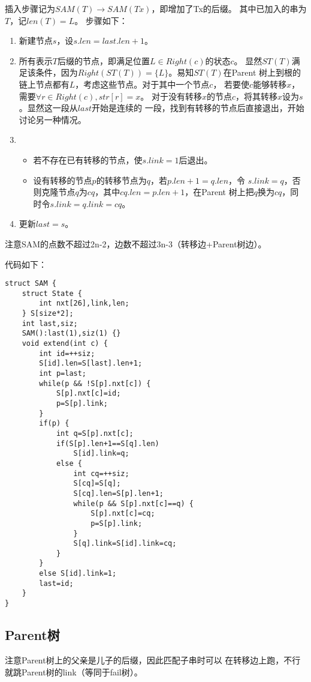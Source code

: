 插入步骤记为$SAM(T)\rightarrow SAM(Tx)$，即增加了Tx的后缀。
其中已加入的串为$T$，记$len(T)=L$。
步骤如下：
\begin{enumerate}
    \item 新建节点$s$，设$s.len=last.len+1$。
    \item 所有表示$T$后缀的节点，即满足位置$L\in Right(c)$的状态$c$。
    显然$ST(T)$满足该条件，因为$Right(ST(T))=\{L\}$。易知$ST(T)$在Parent
    树上到根的链上节点都有$L$，考虑这些节点。对于其中一个节点$c$，
    若要使$c$能够转移$x$，需要$\forall{r\in Right(c)},str[r]=x$。
    对于没有转移$x$的节点$c$，将其转移$x$设为$s$。显然这一段从$last$开始是连续的
    一段，找到有转移的节点后直接退出，开始讨论另一种情况。
    \item \begin{itemize}
        \item 若不存在已有转移的节点，使$s.link=1$后退出。
        \item 设有转移的节点$p$的转移节点为$q$，若$p.len+1=q.len$，令
        $s.link=q$，否则克隆节点$q$为$cq$，其中$cq.len=p.len+1$，在Parent
        树上把$q$换为$cq$，同时令$s.link=q.link=cq$。
    \end{itemize}
    \item 更新$last=s$。
\end{enumerate}
注意SAM的点数不超过2n-2，边数不超过3n-3（转移边+Parent树边）。

代码如下：
\begin{lstlisting}
struct SAM {
    struct State {
        int nxt[26],link,len;
    } S[size*2];
    int last,siz;
    SAM():last(1),siz(1) {}
    void extend(int c) {
        int id=++siz;
        S[id].len=S[last].len+1;
        int p=last;
        while(p && !S[p].nxt[c]) {
            S[p].nxt[c]=id;
            p=S[p].link;
        }
        if(p) {
            int q=S[p].nxt[c];
            if(S[p].len+1==S[q].len)
                S[id].link=q;
            else {
                int cq=++siz;
                S[cq]=S[q];
                S[cq].len=S[p].len+1;
                while(p && S[p].nxt[c]==q) {
                    S[p].nxt[c]=cq;
                    p=S[p].link;
                }
                S[q].link=S[id].link=cq;
            }
        }
        else S[id].link=1;
        last=id;
    }
}
\end{lstlisting}
\subsection{Parent树}
注意Parent树上的父亲是儿子的后缀，因此匹配子串时可以
在转移边上跑，不行就跳Parent树的link（等同于fail树）。
